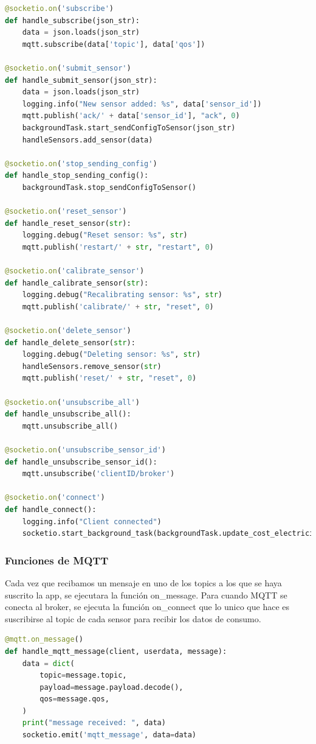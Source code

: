 \begin{titlepage}
\begin{lstlisting}[language=python]
@socketio.on('subscribe')
def handle_subscribe(json_str):
	data = json.loads(json_str)
	mqtt.subscribe(data['topic'], data['qos'])

@socketio.on('submit_sensor')
def handle_submit_sensor(json_str):
	data = json.loads(json_str)
	logging.info("New sensor added: %s", data['sensor_id'])
	mqtt.publish('ack/' + data['sensor_id'], "ack", 0)
	backgroundTask.start_sendConfigToSensor(json_str)
	handleSensors.add_sensor(data)

@socketio.on('stop_sending_config')
def handle_stop_sending_config():
	backgroundTask.stop_sendConfigToSensor()

@socketio.on('reset_sensor')
def handle_reset_sensor(str):
	logging.debug("Reset sensor: %s", str)
	mqtt.publish('restart/' + str, "restart", 0)

@socketio.on('calibrate_sensor')
def handle_calibrate_sensor(str):
	logging.debug("Recalibrating sensor: %s", str)
	mqtt.publish('calibrate/' + str, "reset", 0)

@socketio.on('delete_sensor')
def handle_delete_sensor(str):
	logging.debug("Deleting sensor: %s", str)
	handleSensors.remove_sensor(str)
	mqtt.publish('reset/' + str, "reset", 0)

@socketio.on('unsubscribe_all')
def handle_unsubscribe_all():
	mqtt.unsubscribe_all()

@socketio.on('unsubscribe_sensor_id')
def handle_unsubscribe_sensor_id():
	mqtt.unsubscribe('clientID/broker')

@socketio.on('connect')
def handle_connect():
	logging.info("Client connected")
	socketio.start_background_task(backgroundTask.update_cost_electricity)

\end{lstlisting}

\subsubsection{Funciones de MQTT}
Cada vez que recibamos un mensaje en uno de los topics a los que se haya suscrito la app, se ejecutara la función on\_message. Para cuando MQTT se conecta al broker, se ejecuta la función on\_connect que lo unico que hace es suscribirse al topic de cada sensor para recibir los datos de consumo.\\
\begin{lstlisting}[language=python]
@mqtt.on_message()
def handle_mqtt_message(client, userdata, message):
	data = dict(
		topic=message.topic,
		payload=message.payload.decode(),
		qos=message.qos,
	)
	print("message received: ", data)
	socketio.emit('mqtt_message', data=data)


\end{lstlisting}
\end{titlepage}
